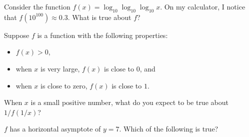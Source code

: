 \documentclass{ximera}
\begin{document}

\begin{problem}
  Consider the function $f(x) = \log_{10} \log_{10} \log_{10} x$.  On my calculator, I notice that $f(10^{100}) \approx 0.3$.  What is true about $f$?
  \begin{multipleChoice}
  \end{multipleChoice}  
\end{problem}

\begin{problem}
  Suppose $f$ is a function with the following properties:
  \begin{itemize}
  \item $f(x) > 0$,
  \item when $x$ is very large, $f(x)$ is close to $0$, and
  \item when $x$ is close to zero, $f(x)$ is close to $1$.
  \end{itemize}
  When $x$ is a small positive number, what do you expect to be true about $1/f(1/x)$?
  \begin{multipleChoice}
  \end{multipleChoice}
\end{problem}

\begin{problem}
	$f$ has a horizontal asymptote of $y = 7$.  Which of the following is true?
	\begin{multipleChoice}
	\end{multipleChoice}
\end{problem}
\end{document}
